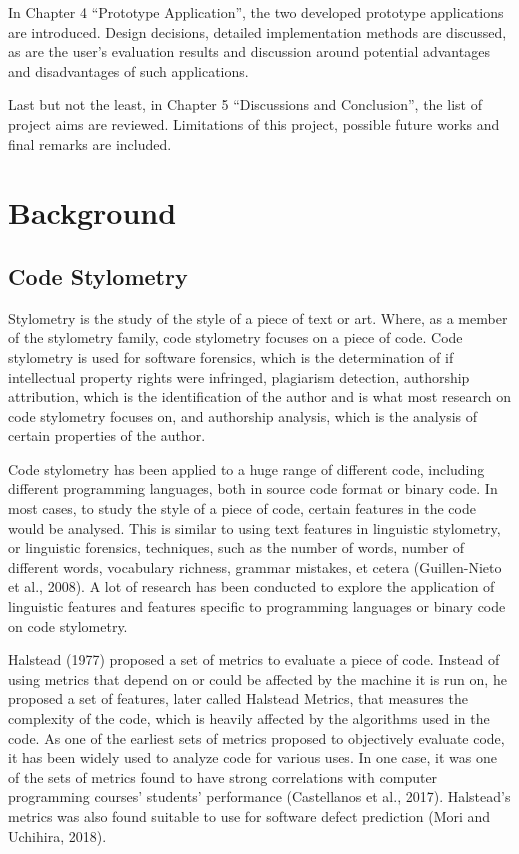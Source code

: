 \documentclass{report}
\begin{document}
In Chapter 4 “Prototype Application”, the two developed prototype applications are introduced. Design decisions, detailed implementation methods are discussed, as are the user's evaluation results and discussion around potential advantages and disadvantages of such applications.

Last but not the least, in Chapter 5 “Discussions and Conclusion”, the list of project aims are reviewed. Limitations of this project, possible future works and final remarks are included.

\chapter{Background}

\section{Code Stylometry}

Stylometry is the study of the style of a piece of text or art. Where, as a member of the stylometry family, code stylometry focuses on a piece of code. Code stylometry is used for software forensics, which is the determination of if intellectual property rights were infringed, plagiarism detection, authorship attribution, which is the identification of the author and is what most research on code stylometry focuses on, and authorship analysis, which is the analysis of certain properties of the author.

Code stylometry has been applied to a huge range of different code, including different programming languages, both in source code format or binary code. In most cases, to study the style of a piece of code, certain features in the code would be analysed. This is similar to using text features in linguistic stylometry, or linguistic forensics, techniques, such as the number of words, number of different words, vocabulary richness, grammar mistakes, et cetera (Guillen-Nieto et al., 2008). A lot of research has been conducted to explore the application of linguistic features and features specific to programming languages or binary code on code stylometry.

Halstead (1977) proposed a set of metrics to evaluate a piece of code. Instead of using metrics that depend on or could be affected by the machine it is run on, he proposed a set of features, later called Halstead Metrics, that measures the complexity of the code, which is heavily affected by the algorithms used in the code. As one of the earliest sets of metrics proposed to objectively evaluate code, it has been widely used to analyze code for various uses. In one case, it was one of the sets of metrics found to have strong correlations with computer programming courses’ students’ performance (Castellanos et al., 2017). Halstead’s metrics was also found suitable to use for software defect prediction (Mori and Uchihira, 2018).
\end{document}

